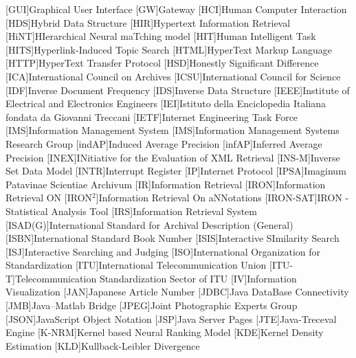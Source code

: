 [GUI]{Graphical User Interface}
[GW]{Gateway}
[HCI]{Human Computer Interaction}
[HDS]{Hybrid Data Structure}
[HIR]{Hypertext Information Retrieval}
[HiNT]{HIerarchical Neural maTching model}
[HIT]{Human Intelligent Task}
[HITS]{Hyperlink-Induced Topic Search}
[HTML]{HyperText Markup Language}
[HTTP]{HyperText Transfer Protocol}
[HSD]{Honestly Significant Difference}
[ICA]{International Council on Archives}
[ICSU]{International Council for Science}
[IDF]{Inverse Document Frequency}
[IDS]{Inverse Data Structure}
[IEEE]{Institute of Electrical and Electronics Engineers}
[IEI]{Istituto della Enciclopedia Italiana fondata da Giovanni Treccani}
[IETF]{Internet Engineering Task Force}
[IMS]{Information Management System}
[IMS]{Information Management Systems Research Group}
[indAP]{Induced Average Precision}
[infAP]{Inferred Average Precision}
[INEX]{INitiative for the Evaluation of \acs{XML} Retrieval}
[INS-M]{Inverse Set Data Model}
[INTR]{Interrupt Register}
[IP]{Internet Protocol}
[IPSA]{Imaginum Patavinae Scientiae Archivum}
[IR]{Information Retrieval}
[IRON]{Information Retrieval ON}
[IRON$^2$]{Information Retrieval On aNNotations}
[IRON-SAT]{\acs{IRON} - Statistical Analysis Tool}
[IRS]{Information Retrieval System}
[ISAD(G)]{International Standard for Archival Description (General)}
[ISBN]{International Standard Book Number}
[ISIS]{Interactive SImilarity Search}
[ISJ]{Interactive Searching and Judging}
[ISO]{International Organization for Standardization}
[ITU]{International Telecommunication Union }
[ITU-T]{Telecommunication Standardization Sector of \acs{ITU}}
[IV]{Information Visualization}
[JAN]{Japanese Article Number}
[JDBC]{Java DataBase Connectivity}
[JMB]{Java--Matlab Bridge}
[JPEG]{Joint Photographic Experts Group}
[JSON]{JavaScript Object Notation}
[JSP]{Java Server Pages}
[JTE]{Java-Treceval Engine}
[K-NRM]{Kernel based Neural Ranking Model}
[KDE]{Kernel Density Estimation}
[KLD]{Kullback-Leibler Divergence}
